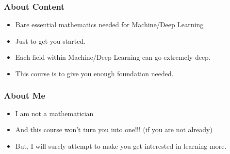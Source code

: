  \begin{frame}[fragile]\frametitle{About Content}
\begin{itemize}
\item Bare essential mathematics needed for Machine/Deep Learning
\item Just to get you started.
\item Each field within Machine/Deep Learning can go extremely deep.
\item This course is to give you enough foundation needed.
\end{itemize}
\end{frame}

 \begin{frame}[fragile]\frametitle{About Me}
\begin{itemize}
\item I am not a mathematician
\item And this course won't turn you into one!!! (if you are not already)
\item But, I will surely attempt to make you get interested in learning more.
\end{itemize}
\end{frame}

